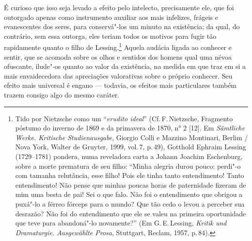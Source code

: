 É curioso que isso seja levado a efeito pelo intelecto, precisamente
ele, que foi outorgado apenas como instrumento auxiliar aos mais
infelizes, frágeis e evanescentes dos seres, para conservá"-los um
minuto na existência; da qual, do contrário, sem essa outorga, eles
teriam todos os motivos para fugir tão rapidamente quanto o filho de
Lessing.\footnote{ Tido por Nietzsche como um “\textit{erudito ideal}”
(Cf.\,F.\,Nietzsche, Fragmento póstumo do inverno de 1869 e da primavera
de 1870, n° 2 [12]. Em \textit{Sämtliche Werke. Kritische
Studienausgabe}, Giorgio Colli e Mazzino Montinari, Berlim / Nova
York, Walter de Gruyter, 1999, vol.\,7, p.\,49), Gotthold Ephraim Lessing
(1729--1781) pondera, numa reveladora carta a Johann Joachim
Eschenburg, sobre a morte prematura de seu filho: “Minha alegria durou
pouco: perdi"-o com tamanha relutância, esse filho! Pois ele tinha
tanto entendimento! Tanto entendimento! Não pense que minhas poucas
horas de paternidade fizeram de mim uma besta de pai! Sei o que falo.
Não foi o entendimento que obrigou a puxá"-lo a férreo fórceps
para o mundo? Que tão cedo o levou a perceber sua desrazão? Não foi do
entendimento que ele se valeu na primeira oportunidade que teve para
abandoná"-lo novamente?” (Em G.\,E.\,Lessing, \textit{Kritik und
Dramaturgie. Ausgewählte Prosa}, Stuttgart, Reclam, 1957, p.\,84).}
Aquela audácia ligada ao conhecer e sentir, que se acomoda sobre os
olhos e sentidos dos homens qual uma névoa ofuscante, ilude"-os quanto
ao valor da existência, na medida em que traz em si a mais
envaidecedora das apreciações valorativas sobre o próprio conhecer. Seu
efeito mais universal é engano --- todavia, os efeitos mais particulares
também trazem consigo algo do mesmo caráter.

